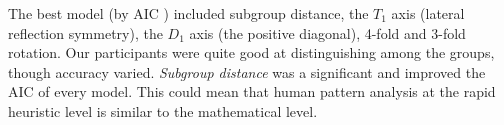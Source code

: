 The best model (by AIC ) included subgroup distance, the $T_1$ axis (lateral reflection symmetry), the $D_1$ axis (the positive diagonal), 4-fold and 3-fold rotation. Our participants were quite good at distinguishing among the groups, though accuracy varied. \textit{Subgroup distance} was a significant and improved the AIC of every model. This could mean that human pattern analysis at the rapid heuristic level is similar to the mathematical level. 